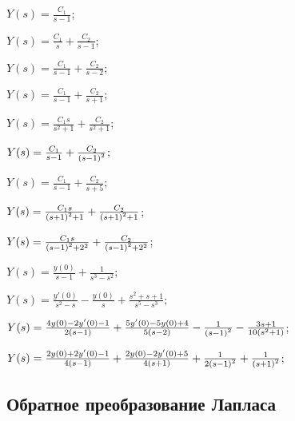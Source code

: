 \begin{enumsols}
		\item \( Y(s) = \frac{C_1}{s - 1} \); \sfill %
		\item \( Y(s) = \frac{C_1}{s} + \frac{C_2}{s - 1} \); \sfill %
		\item \( Y(s) = \frac{C_1}{s - 1} + \frac{C_2}{s - 2} \); \sfill %
		\item \( Y(s) = \frac{C_1}{s - 1} + \frac{C_2}{s + 1} \); \sfill %
		\item \( Y(s) = \frac{C_1s}{s^2 + 1} + \frac{C_2}{s^2 + 1} \); \sfill %
		\item \( Y(s) = \frac{C_1}{s - 1} + \frac{C_2}{\left( s - 1 \right)^2} \); \sfill %
		\item \( Y(s) = \frac{C_1}{s - 1} + \frac{C_2}{s + 5} \); \sfill %
		\item \( Y(s) = \frac{C_1 s}{\left( s + 1 \right)^2 + 1} + \frac{C_2}{\left( s + 1 \right)^2 + 1} \); \sfill %
		\item \( Y(s) = \frac{C_1 s}{\left( s - 1 \right)^2 + 2^2} + \frac{C_2}{\left( s - 1 \right)^2 + 2^2} \); \sfill %

		\item \( Y(s) = \frac{y(0)}{s - 1} + \frac{1}{s^3 - s^2} \); \sfill %
		\item \( Y(s) = \frac{y'(0)}{s^2 - s} - \frac{y(0)}{s} + \frac{s^2 + s + 1}{s^5 - s^3} \); \sfill %
		\item \( Y(s) = \frac{4 y(0) - 2y'(0) - 1}{2\left( s-1 \right)} + \frac{5y'(0) - 5y(0) + 4}{5\left( s-2 \right)} - \frac{1}{\left( s-1 \right)^2} - \frac{3s + 1}{10 \left( s^2+1 \right)} \); \sfill %
		\item \( Y(s) = \frac{2 y(0) + 2y'(0) - 1}{4 \left( s-1 \right)} + \frac{2 y(0) - 2y'(0) + 5}{4 \left( s+1 \right)} + \frac{1}{2 \left( s-1 \right)^2} + \frac{1}{\left( s+1 \right)^2} \); \sfill %

	\end{enumsols}

\subsection*{Обратное преобразование Лапласа}

